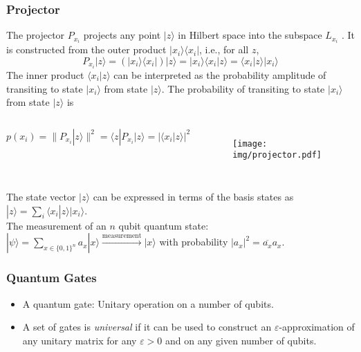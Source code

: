 \documentclass[UTF8,aspectratio=43,11pt,colorlinks,compress,openany]{beamer}%
\begin{document}
\begin{frame}\frametitle{Projector}
\setlength\abovedisplayskip{0pt}
\setlength\belowdisplayskip{0pt}
	The projector $P_{x_i}$ projects any point $|z\rangle$ in Hilbert space into the subspace $L_{x_i}$ . It is constructed from the outer product $|x_i\rangle\langle x_i|$, i.e., for all $z$,
	\[P_{x_i}|z\rangle=(|x_i\rangle\langle x_i|)|z\rangle=|x_i\rangle\langle x_i|z\rangle=\langle x_i|z\rangle|x_i\rangle\]
	The inner product $\langle x_i|z\rangle$ can be interpreted as the probability amplitude of transiting to state $|x_i\rangle$ from state $|z\rangle$. The probability of transiting to state $|x_i\rangle$ from state $|z\rangle$ is
\begin{columns}
\[p(x_i)=\|P_{x_i}|z\rangle\|^2=\langle z|P_{x_i}|z\rangle=|\langle x_i|z\rangle|^2\]
	\begin{figure}[H]
		\texttt{[image: img/projector.pdf]}
	\end{figure}
\end{columns}
The state vector $|z\rangle$ can be expressed in terms of the basis states as $|z\rangle=\sum\limits_i\langle x_i|z\rangle|x_i\rangle$.\\
The measurement of an $n$ qubit quantum state: $|\psi\rangle=\sum\limits_{x\in\{0,1\}^n}a_x|x\rangle \xrightarrow{\text{measurement}} |x\rangle$ with probability $|a_x|^2=\overline{a_x}a_x$.
\end{frame}

\begin{frame}\frametitle{Quantum Gates}
\begin{itemize}
	\item A quantum gate: Unitary operation on a number of qubits.
	\item A set of gates is \emph{universal} if it can be used to construct an $\varepsilon$-approximation of any unitary matrix for any $\varepsilon>0$ and on any given number of qubits.
\end{itemize}
\end{frame}
\end{document}
